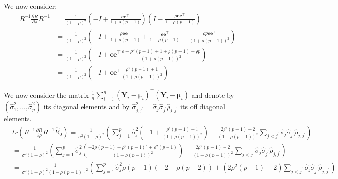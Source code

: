 \documentclass[12pt]{article}
\newcommand\Ve{\mathbf{e}}
\newcommand\VY{\mathbf{Y}}
\newcommand\Vmu{\boldsymbol{\mu}}
\newcommand\trans[1]{{#1}^\intercal}%
\begin{document}
We now consider:
\begin{align*}
R^{-1} \frac{\partial R}{\partial\rho} R^{-1} &= \frac{1}{(1-\rho)^2} \left(-I +  \frac{\Ve\trans{\Ve}}{1+\rho(p-1)}\right)\left(I - \frac{\rho \Ve\trans{\Ve}}{1+\rho(p-1)}\right) \\
&= \frac{1}{(1-\rho)^2} \left(-I + \frac{\rho \Ve\trans{\Ve}}{1+\rho(p-1)} + \frac{\Ve\trans{\Ve}}{1+\rho(p-1)} - \frac{\rho p \Ve\trans{\Ve}}{(1+\rho(p-1))^2}\right) \\
&= \frac{1}{(1-\rho)^2} \left(-I + \Ve\trans{\Ve} \frac{\rho+\rho^2(p-1) + 1+ \rho(p-1) - \rho p}{(1+\rho(p-1))^2}\right) \\
&= \frac{1}{(1-\rho)^2} \left(-I + \Ve\trans{\Ve} \frac{\rho^2(p-1) + 1}{(1+\rho(p-1))^2}\right) 
\end{align*}

We now consider the matrix \(\frac{1}{n}\sum_{i=1}^n \trans{(\VY_i-\Vmu_i)} (\VY_i-\Vmu_i)\) and denote by
\(\left(\widehat{\sigma}^2_1,\ldots,\widehat{\sigma}^2_p\right)\) its
diagonal elements and by
\(\widehat{\sigma}^2_{j,j^{\prime}}=\widehat{\sigma}_j
\widehat{\sigma}_{j^{\prime}}\widehat{\rho}_{j,j^{\prime}}\) its off
diagonal elements.
\begin{align*}
& tr \left( R^{-1} \frac{\partial R}{\partial\rho} R^{-1} \widehat{R}_0 \right) = \frac{1}{\sigma^2(1-\rho)^2}\left(\sum_{j=1}^p \widehat{\sigma}^2_j\left(-1+\frac{\rho^2(p-1) + 1}{(1+\rho(p-1))^2}\right) + \frac{2\rho^2(p-1) + 2}{(1+\rho(p-1))^2} \sum_{j < j^{\prime}}\widehat{\sigma}_j
\widehat{\sigma}_{j^{\prime}}\widehat{\rho}_{j,j^{\prime}}\right) \\
&= \frac{1}{\sigma^2(1-\rho)^2}\left(\sum_{j=1}^p \widehat{\sigma}^2_j\left(\frac{-2\rho(p-1)-\rho^2(p-1)^2+\rho^2(p-1)}{(1+\rho(p-1))^2}\right) + \frac{2\rho^2(p-1) + 2}{(1+\rho(p-1))^2} \sum_{j < j^{\prime}}\widehat{\sigma}_j
\widehat{\sigma}_{j^{\prime}}\widehat{\rho}_{j,j^{\prime}}\right) \\
&= \frac{1}{\sigma^2(1-\rho)^2(1+\rho(p-1))^2}\left(\sum_{j=1}^p \widehat{\sigma}^2_j \rho(p-1)\left(-2-\rho (p-2)\right) + \left(2\rho^2(p-1) + 2\right) \sum_{j < j^{\prime}}\widehat{\sigma}_j
\widehat{\sigma}_{j^{\prime}}\widehat{\rho}_{j,j^{\prime}}\right)
\end{align*}
\end{document}
